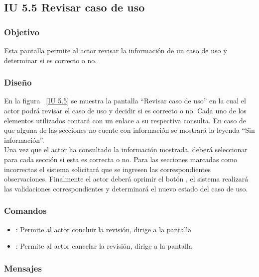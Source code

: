 \newpage 
\subsection{IU 5.5 Revisar caso de uso}

\subsubsection{Objetivo}
	
	Esta pantalla permite al actor revisar la información de un caso de uso y determinar si es correcto o no.

\subsubsection{Diseño}

    En la figura ~\ref{IU 5.5} se muestra la pantalla ``Revisar caso de uso'' en la cual el actor podrá revisar el caso de uso y decidir si es correcto o no. Cada uno de los elementos utilizados contará con un enlace a su respectiva consulta. En caso de que alguna de las secciones no cuente con información se mostrará la leyenda ``Sin información''. \\
	
	Una vez que el actor ha consultado la información mostrada, deberá seleccionar para cada sección si esta es correcta o no. Para las secciones marcadas como incorrectas el sistema solicitará que se ingresen las correspondientes observaciones. Finalmente el actor deberá oprimir el botón , el sistema realizará las validaciones correspondientes y determinará el nuevo estado del caso de uso.


\subsubsection{Comandos}
\begin{itemize}
	\item {}: Permite al actor concluir la revisión, dirige a la pantalla 
	\item {}: Permite al actor cancelar la revisión, dirige a la pantalla 
\end{itemize}

\subsubsection{Mensajes}
	
